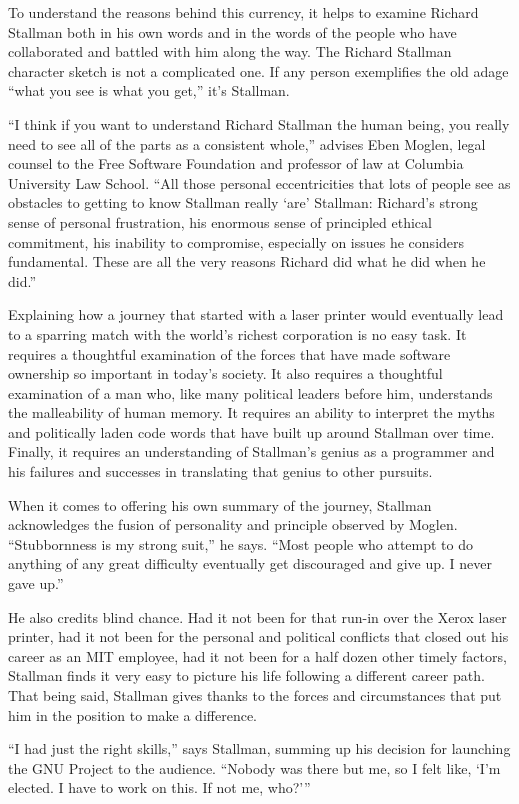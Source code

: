 To understand the reasons behind this currency, it helps to examine Richard Stallman both in his own words and in the words of the people who have collaborated and battled with him along the way. The Richard Stallman character sketch is not a complicated one. If any person exemplifies the old adage ``what you see is what you get,'' it's Stallman.

``I think if you want to understand Richard Stallman the human being, you really need to see all of the parts as a consistent whole,'' advises Eben Moglen, legal counsel to the Free Software Foundation and professor of law at Columbia University Law School. ``All those personal eccentricities that lots of people see as obstacles to getting to know Stallman really `are' Stallman: Richard's strong sense of personal frustration, his enormous sense of principled ethical commitment, his inability to compromise, especially on issues he considers fundamental. These are all the very reasons Richard did what he did when he did.''

Explaining how a journey that started with a laser printer would eventually lead to a sparring match with the world's richest corporation is no easy task. It requires a thoughtful examination of the forces that have made software ownership so important in today's society. It also requires a thoughtful examination of a man who, like many political leaders before him, understands the malleability of human memory. It requires an ability to interpret the myths and politically laden code words that have built up around Stallman over time. Finally, it requires an understanding of Stallman's genius as a programmer and his failures and successes in translating that genius to other pursuits.

When it comes to offering his own summary of the journey, Stallman acknowledges the fusion of personality and principle observed by Moglen. ``Stubbornness is my strong suit,'' he says. ``Most people who attempt to do anything of any great difficulty eventually get discouraged and give up. I never gave up.''

He also credits blind chance. Had it not been for that run-in over the Xerox laser printer, had it not been for the personal and political conflicts that closed out his career as an MIT employee, had it not been for a half dozen other timely factors, Stallman finds it very easy to picture his life following a different career path. That being said, Stallman gives thanks to the forces and circumstances that put him in the position to make a difference.

``I had just the right skills,'' says Stallman, summing up his decision for launching the GNU Project to the audience. ``Nobody was there but me, so I felt like, `I'm elected. I have to work on this. If not me, who?'\hspace{0.01in}''

\theendnotes
\setcounter{endnote}{0}
